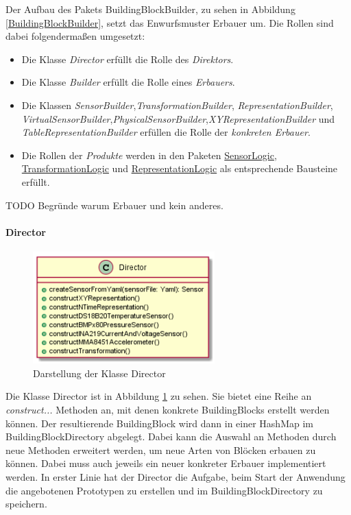 \documentclass[parskip=full]{scrartcl}
\begin{document}
Der Aufbau des Pakets BuildingBlockBuilder, zu sehen in Abbildung \ref{BuildingBlockBuilder}, setzt das Enwurfsmuster Erbauer um. Die Rollen sind dabei folgendermaßen umgesetzt:
\begin{itemize}

\item Die Klasse \textit{Director} erfüllt die Rolle des \textit{Direktors}.
\item Die Klasse \textit{Builder} erfüllt die Rolle eines \textit{Erbauers}.
\item Die Klassen \textit{SensorBuilder},\textit{TransformationBuilder}, \textit{RepresentationBuilder},
\textit{VirtualSensorBuilder},\textit{PhysicalSensorBuilder},\textit{XYRepresentationBuilder} und \textit{TableRepresentationBuilder}  erfüllen die Rolle der \textit{konkreten Erbauer}.
\item Die Rollen der \textit{Produkte} werden in den Paketen \hyperlink{SensorLogic}{SensorLogic}, \hyperlink{TransformationLogic}{TransformationLogic} und \hyperlink{RepresentationLogic}{RepresentationLogic} als entsprechende Bausteine erfüllt.

\end{itemize} 
TODO Begründe warum Erbauer und kein anderes.




\paragraph{Director}
\begin{figure}[htbp]
	\begin{center}
		\includegraphics[width = 7cm]{Grafiken/Director.png}
		\caption{Darstellung der Klasse Director}
		\label{Director}
	\end{center}
\end{figure}
Die Klasse Director ist in Abbildung \ref{Director} zu sehen. Sie bietet eine Reihe an \textit{construct...} Methoden an, mit denen konkrete BuildingBlocks erstellt werden können. Der resultierende BuildingBlock wird dann in einer HashMap im BuildingBlockDirectory abgelegt. Dabei kann die Auswahl an Methoden durch neue Methoden erweitert werden, um neue Arten von Blöcken erbauen zu können. Dabei muss auch jeweils ein neuer konkreter Erbauer implementiert werden. In erster Linie hat der Director die Aufgabe, beim Start der Anwendung die angebotenen Prototypen zu erstellen und im BuildingBlockDirectory zu speichern. 
\end{document}
